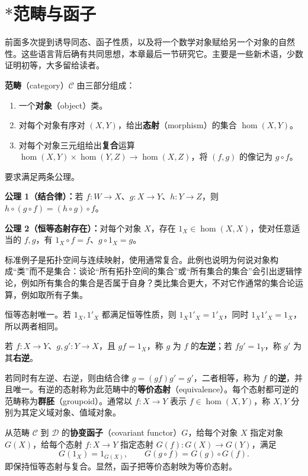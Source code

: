 \section{\texorpdfstring{$*$}{*}范畴与函子}
前面多次提到诱导同态、函子性质，以及将一个数学对象赋给另一个对象的自然性。这些语言背后确有共同思想，本章最后一节研究它。主要是一些新术语，少数证明初等，大多留给读者。

\textbf{范畴}（category）$\mathcal C$ 由三部分组成：
\begin{enumerate}[label=(\arabic*)]
\item 一个\textbf{对象}（object）类。
\item 对每个对象有序对 $(X,Y)$，给出\textbf{态射}（morphism）的集合 $\operatorname{hom}(X,Y)$。
\item 对每个对象三元组给出\textbf{复合}运算 $\operatorname{hom}(X,Y)\times\operatorname{hom}(Y,Z)\to\operatorname{hom}(X,Z)$，将 $(f,g)$ 的像记为 $g\circ f$。
\end{enumerate}
要求满足两条公理。

\noindent\textbf{公理 1（结合律）：}若 $f:W\to X$、$g:X\to Y$、$h:Y\to Z$，则 $h\circ(g\circ f)=(h\circ g)\circ f$。

\noindent\textbf{公理 2（恒等态射存在）：}对每个对象 $X$，存在 $1_X\in\operatorname{hom}(X,X)$，使对任意适当的 $f,g$，有 $1_X\circ f=f$、$g\circ1_X=g$。

标准例子是拓扑空间与连续映射，使用通常复合。此例也说明为何说对象构成“类”而不是集合：谈论“所有拓扑空间的集合”或“所有集合的集合”会引出逻辑悖论，例如所有集合的集合是否属于自身？类比集合更大，不对它作通常的集合论运算，例如取所有子集。

恒等态射唯一。若 $1_X,1'_X$ 都满足恒等性质，则 $1_X1'_X=1'_X$，同时 $1_X1'_X=1_X$，所以两者相同。

若 $f:X\to Y$、$g,g':Y\to X$，且 $gf=1_X$，称 $g$ 为 $f$ 的\textbf{左逆}；若 $fg'=1_Y$，称 $g'$ 为其\textbf{右逆}。

若同时有左逆、右逆，则由结合律 $g=(g f)g'=g'$，二者相等，称为 $f$ 的\textbf{逆}，并且唯一。有逆的态射称为此范畴中的\textbf{等价态射}（equivalence）。每个态射都可逆的范畴称为\textbf{群胚}（groupoid）。通常以 $f:X\to Y$ 表示 $f\in\operatorname{hom}(X,Y)$，称 $X,Y$ 分别为其定义域对象、值域对象。

从范畴 $\mathcal C$ 到 $\mathcal D$ 的\textbf{协变函子}（covariant functor）$G$，给每个对象 $X$ 指定对象 $G(X)$，给每个态射 $f:X\to Y$ 指定态射 $G(f):G(X)\to G(Y)$，满足
\[
G(1_X)=1_{G(X)},\qquad G(g\circ f)=G(g)\circ G(f).
\]
即保持恒等态射与复合。显然，函子把等价态射映为等价态射。

